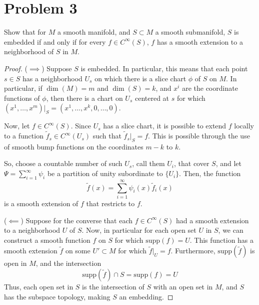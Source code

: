 \documentclass[fontsize=11pt]{scrartcl} %
\numberwithin{equation}{section} %
\numberwithin{figure}{section} %
\numberwithin{table}{section} %
\begin{document}
\section*{Problem 3}
Show that for $M$ a smooth manifold, and $S\subset M$ a smooth submanifold, $S$
is embedded if and only if for every $f\in C^{\infty}(S)$, $f$ has a smooth
extension to a neighborhood of $S$ in $M$.
\\
\begin{proof}
    ($\implies$)
    Suppose $S$ is embedded. In particular, this means that each point $s\in S$
    has a neighborhood $U_s$ on which there is a slice chart $\phi$ of $S$ on
    $M$. In particular, if $\dim(M)=m$ and $\dim(S)=k$, and $x^i$ are the
    coordinate functions of $\phi$, then there is a chart on $U_s$ centered at
    $s$ for which $(x^1,\ldots,x^m)|_S = (x^1,\ldots,x^k,0,\ldots,0)$.

    Now, let $f\in C^{\infty}(S)$. Since $U_s$ has a slice chart, it is possible
    to extend $f$ locally to a function $\tilde{f}_s\in C^{\infty}(U_s)$ such
    that $\tilde{f}_s|_S = f$. This is possible through the use of smooth bump
    functions on the coordinates $m-k$ to $k$. 


    So, choose a countable number of such $U_s$, call them $U_i$, that cover
    $S$, and let $\Psi = \sum_{i=1}^{\infty}\psi_i$ be a partition of unity
    subordinate to $\{U_i\}$. Then, the function
    \[
        \tilde{f}(x) = \sum_{i=1}^{\infty}\psi_i(x)\tilde{f}_i(x)
    \]
    is a smooth extension of $f$ that restricts to $f$. 

    ($\impliedby$)
    Suppose for the converse that each $f\in C^{\infty}(S)$ had a smooth
    extension to a neighborhood $U$ of $S$. Now, in particular for each open set
    $U$ in $S$, we can construct a smooth function $f$ on $S$ for which
    $\textrm{supp}(f) = U$. This function has a smooth extension $\tilde{f}$ on some
    $U'\subset M$ for which $\tilde{f}|_U=f$. Furthermore,
    $\textrm{supp}(\tilde{f})$ is open in $M$, and the intersection
    \[
        \textrm{supp}(\tilde{f})\cap S = \textrm{supp}(f)=U
    \]
    Thus, each open set in $S$ is the intersection of $S$ with an open set in
    $M$, and $S$ has the subspace topology, making $S$ an embedding.
\end{proof}
\newpage
\end{document}
